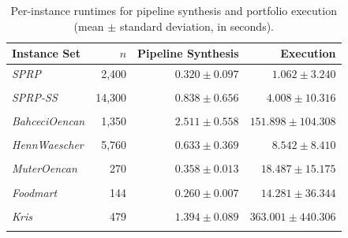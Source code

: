 \begin{table}[tbp]
\centering
\caption{Per-instance runtimes for pipeline synthesis and portfolio execution (mean $\pm$ standard deviation, in seconds).}
\label{tab:runtimes}
\small
\begin{tabular}{@{}lrrr@{}}
\toprule
Instance Set & $n$ & Pipeline Synthesis & Execution \\
\midrule
\textit{SPRP} & 2,400 & $0.320 \pm 0.097$ & $1.062 \pm 3.240$ \\\\
\textit{SPRP-SS} & 14,300 & $0.838 \pm 0.656$ & $4.008 \pm 10.316$ \\\\
\textit{BahceciOencan} & 1,350 & $2.511 \pm 0.558$ & $151.898 \pm 104.308$ \\\\
\textit{HennWaescher} & 5,760 & $0.633 \pm 0.369$ & $8.542 \pm 8.410$ \\\\
\textit{MuterOencan} & 270 & $0.358 \pm 0.013$ & $18.487 \pm 15.175$ \\\\
\textit{Foodmart} & 144 & $0.260 \pm 0.007$ & $14.281 \pm 36.344$ \\\\
\textit{Kris} & 479 & $1.394 \pm 0.089$ & $363.001 \pm 440.306$ \\\\
\bottomrule
\end{tabular}
\end{table}
